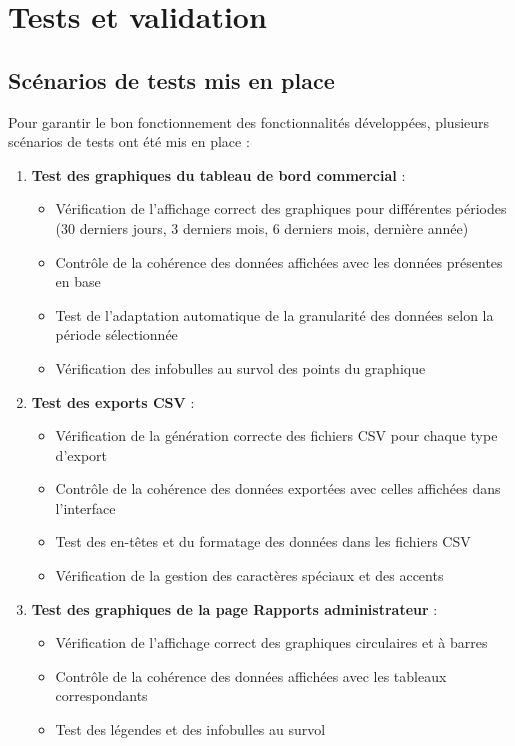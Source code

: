 \documentclass[a4paper,12pt]{report}
\begin{document}
\section{Tests et validation}
  \subsection{Scénarios de tests mis en place}
  Pour garantir le bon fonctionnement des fonctionnalités développées, plusieurs scénarios de tests ont été mis en place :
  
  \begin{enumerate}
    \item \textbf{Test des graphiques du tableau de bord commercial} :
    \begin{itemize}
      \item Vérification de l'affichage correct des graphiques pour différentes périodes (30 derniers jours, 3 derniers mois, 6 derniers mois, dernière année)
      \item Contrôle de la cohérence des données affichées avec les données présentes en base
      \item Test de l'adaptation automatique de la granularité des données selon la période sélectionnée
      \item Vérification des infobulles au survol des points du graphique
    \end{itemize}
    
    \item \textbf{Test des exports CSV} :
    \begin{itemize}
      \item Vérification de la génération correcte des fichiers CSV pour chaque type d'export
      \item Contrôle de la cohérence des données exportées avec celles affichées dans l'interface
      \item Test des en-têtes et du formatage des données dans les fichiers CSV
      \item Vérification de la gestion des caractères spéciaux et des accents
    \end{itemize}
    
    \item \textbf{Test des graphiques de la page Rapports administrateur} :
    \begin{itemize}
      \item Vérification de l'affichage correct des graphiques circulaires et à barres
      \item Contrôle de la cohérence des données affichées avec les tableaux correspondants
      \item Test des légendes et des infobulles au survol
    \end{itemize}
    
  \end{enumerate}
\end{document}
